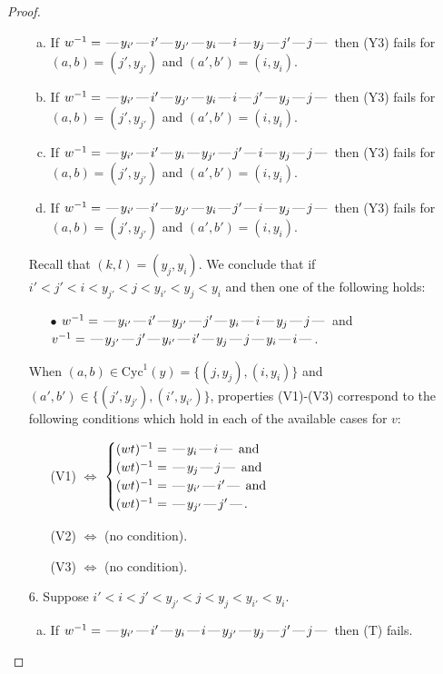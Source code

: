 \documentclass[10pt]{article}
\theoremstyle{definition}
\theoremstyle{definition}
\def\dash{\text{\hspace{0.5mm}---\hspace{0.5mm}}}
\def\Cyc{\mathrm{Cyc}}
\begin{document}
\begin{proof}
\begin{enumerate}
\begin{enumerate}[(a)]
\item If $w^{-1} = \dash y_{i'}\dash i'\dash y_{j'}\dash y_i\dash i\dash y_j\dash j'\dash j\dash $ then (Y3) fails for $(a,b)=(j',y_{j'})$ and $(a',b')=(i,y_i)$.
\item If $w^{-1} = \dash y_{i'}\dash i'\dash y_{j'}\dash y_i\dash i\dash j'\dash y_j\dash j\dash $ then (Y3) fails for $(a,b)=(j',y_{j'})$ and $(a',b')=(i,y_i)$.
\item If $w^{-1} = \dash y_{i'}\dash i'\dash y_i\dash y_{j'}\dash j'\dash i\dash y_j\dash j\dash $ then (Y3) fails for $(a,b)=(j',y_{j'})$ and $(a',b')=(i,y_i)$.
\item If $w^{-1} = \dash y_{i'}\dash i'\dash y_{j'}\dash y_i\dash j'\dash i\dash y_j\dash j\dash $ then (Y3) fails for $(a,b)=(j',y_{j'})$ and $(a',b')=(i,y_i)$.
\end{enumerate}
Recall that $(k,l) = (y_j,y_i)$.
We conclude that if $i' < j' < i < y_{j'} < j < y_{i'} < y_j < y_i$ and then one of the following holds:
\begin{enumerate}
\item[$\bullet$] $w^{-1} = \dash y_{i'}\dash i'\dash y_{j'}\dash j'\dash y_i\dash i\dash y_j\dash j\dash $ and $v^{-1} = \dash y_{j'}\dash j'\dash y_{i'}\dash i'\dash y_j\dash j\dash y_i\dash i\dash $.
\end{enumerate}
When $(a,b)\in\Cyc^1(y)=\{(j,y_j),(i,y_i)\}$ and $(a',b')\in\{(j',y_{j'}),(i',y_{i'})\}$,
properties (V1)-(V3) correspond to the following conditions which hold in
each of the available cases for $v$:
\begin{enumerate}
\item[](V1) $\Leftrightarrow$ $\begin{cases}\text{$(wt)^{-1} = \dash y_i \dash i \dash$}\text{ and }\\
\text{$(wt)^{-1} = \dash y_j \dash j \dash$}\text{ and }\\
\text{$(wt)^{-1} = \dash y_{i'} \dash i' \dash$}\text{ and }\\
\text{$(wt)^{-1} = \dash y_{j'} \dash j' \dash$}.\end{cases}$
\item[](V2) $\Leftrightarrow$ (no condition).
\item[](V3) $\Leftrightarrow$ (no condition).
\end{enumerate}
\item[$6$.] Suppose $i' < i < j' < y_{j'} < j < y_j < y_{i'} < y_i$.
\begin{enumerate}[(a)]
\item If $w^{-1} = \dash y_{i'}\dash i'\dash y_i\dash i\dash y_{j'}\dash y_j\dash j'\dash j\dash $ then (T) fails.

\end{enumerate}
\end{enumerate}
\end{proof}
\end{document}
